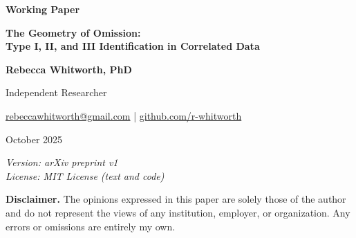 \documentclass[11pt]{article}
\begin{document}
\begingroup
\centering
{\Large \textbf{Working Paper}}\par\vspace{0.5em}
{\LARGE \textbf{The Geometry of Omission:}\\[0.25em]
\LARGE \textbf{Type I, II, and III Identification in Correlated Data}}\par
\vspace{1em}

{\large \textbf{Rebecca Whitworth, PhD}}\par
{\large Independent Researcher}\par
\vspace{0.4em}
{\large \href{mailto:rebeccawhitworth@gmail.com}{rebeccawhitworth@gmail.com} \quad|\quad
\href{https://github.com/r-whitworth}{github.com/r-whitworth}}\par
\vspace{1em}
{\large October 2025}\par
{\small \textit{Version: arXiv preprint v1\hspace{0pt}\\
License: MIT License (text and code)}}

\vspace{1em}
\begin{minipage}{0.92\textwidth}
\small
\textbf{Disclaimer.} The opinions expressed in this paper are solely those of the author and do not represent the views of any institution, employer, or organization. Any errors or omissions are entirely my own.
\end{minipage}
\par
\endgroup

\vspace{0.75em}
\end{document}
